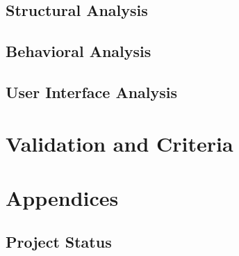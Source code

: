 \documentclass[12pt]{article}
\begin{document}
\subsection{Structural Analysis}

\subsection{Behavioral Analysis}

\subsection{User Interface Analysis}

\section{Validation and Criteria}

\section{Appendices}

\subsection{Project Status}
\end{document}
